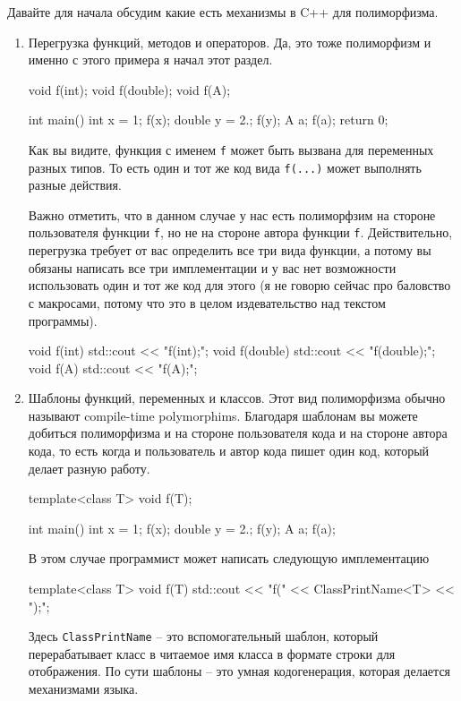 Давайте для начала обсудим какие есть механизмы в C++ для полиморфизма.
\begin{enumerate}
\item Перегрузка функций, методов и операторов.
Да, это тоже полиморфизм и именно с этого примера я начал этот раздел.
\begin{cppcode}
void f(int);
void f(double);
void f(A);

int main() {
  int x = 1;
  f(x);
  double y = 2.;
  f(y);
  A a;
  f(a);
 return 0;
}
\end{cppcode}
Как вы видите, функция с именем \texttt{f} может быть вызвана для переменных разных типов.
То есть один и тот же код вида \texttt{f(...)} может выполнять разные действия.

Важно отметить, что в данном случае у нас есть полиморфзим на стороне пользователя функции \texttt{f}, но не на стороне автора функции \texttt{f}.
Действительно, перегрузка требует от вас определить все три вида функции, а потому вы обязаны написать все три имплементации и у вас нет возможности использовать один и тот же код для этого (я не говорю сейчас про баловство с макросами, потому что это в целом издевательство над текстом программы).
\begin{cppcode}
void f(int) {
  std::cout << "f(int);\n";
}
void f(double) {
  std::cout << "f(double);\n";
}
void f(A) {
  std::cout << "f(A);\n";
}
\end{cppcode}

\item Шаблоны функций, переменных и классов.
Этот вид полиморфизма обычно называют compile-time polymorphims.
Благодаря шаблонам вы можете добиться полиморфизма и на стороне пользователя кода и на стороне автора кода, то есть когда и пользователь и автор кода пишет один код, который делает разную работу.
\begin{cppcode}
template<class T>
void f(T);

int main() {
  int x = 1;
  f(x);
  double y = 2.;
  f(y);
  A a;
  f(a);
}
\end{cppcode}
В этом случае программист может написать следующую имплементацию
\begin{cppcode}
template<class T>
void f(T) {
  std::cout << "f(" << ClassPrintName<T> << ");\n";
}
\end{cppcode}
Здесь \texttt{ClassPrintName} -- это вспомогательный шаблон, который перерабатывает класс в читаемое имя класса в формате строки для отображения.
По сути шаблоны -- это умная кодогенерация, которая делается механизмами языка.


\end{enumerate}
